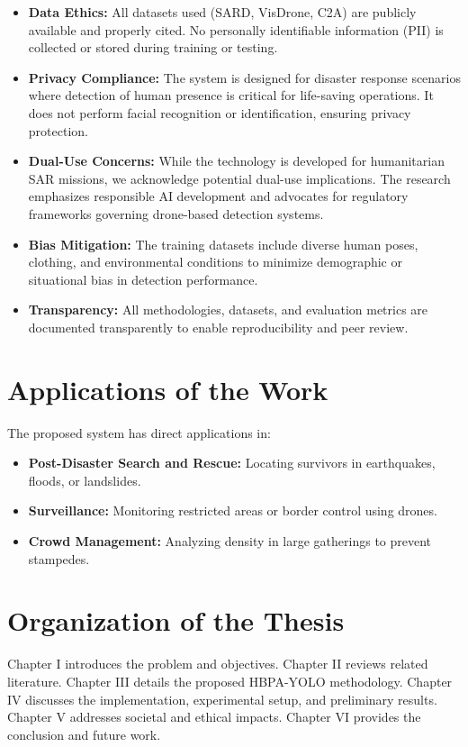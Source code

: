 \documentclass[12pt, a4paper]{report}
\begin{document}
\begin{itemize}
    \item \textbf{Data Ethics:} All datasets used (SARD, VisDrone, C2A) are publicly available and properly cited. No personally identifiable information (PII) is collected or stored during training or testing.
    \item \textbf{Privacy Compliance:} The system is designed for disaster response scenarios where detection of human presence is critical for life-saving operations. It does not perform facial recognition or identification, ensuring privacy protection.
    \item \textbf{Dual-Use Concerns:} While the technology is developed for humanitarian SAR missions, we acknowledge potential dual-use implications. The research emphasizes responsible AI development and advocates for regulatory frameworks governing drone-based detection systems.
    \item \textbf{Bias Mitigation:} The training datasets include diverse human poses, clothing, and environmental conditions to minimize demographic or situational bias in detection performance.
    \item \textbf{Transparency:} All methodologies, datasets, and evaluation metrics are documented transparently to enable reproducibility and peer review.
\end{itemize}

\section{Applications of the Work}
The proposed system has direct applications in:
\begin{itemize}
    \item \textbf{Post-Disaster Search and Rescue:} Locating survivors in earthquakes, floods, or landslides.
    \item \textbf{Surveillance:} Monitoring restricted areas or border control using drones.
    \item \textbf{Crowd Management:} Analyzing density in large gatherings to prevent stampedes.
\end{itemize}

\section{Organization of the Thesis}
Chapter I introduces the problem and objectives. Chapter II reviews related literature. Chapter III details the proposed HBPA-YOLO methodology. Chapter IV discusses the implementation, experimental setup, and preliminary results. Chapter V addresses societal and ethical impacts. Chapter VI provides the conclusion and future work.
\end{document}

